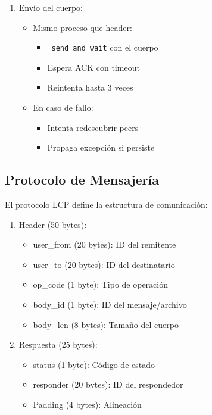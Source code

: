 \documentclass[12pt]{article}
\begin{document}
\begin{enumerate}
    \item Envío del cuerpo:
    \begin{itemize}
        \item Mismo proceso que header:
        \begin{itemize}
            \item \texttt{\_send\_and\_wait} con el cuerpo
            \item Espera ACK con timeout
            \item Reintenta hasta 3 veces
        \end{itemize}
        \item En caso de fallo:
        \begin{itemize}
            \item Intenta redescubrir peers
            \item Propaga excepción si persiste
        \end{itemize}
    \end{itemize}
\end{enumerate}

\subsection{Protocolo de Mensajería}
El protocolo LCP define la estructura de comunicación:

\begin{enumerate}
    \item Header (50 bytes):
    \begin{itemize}
        \item user\_from (20 bytes): ID del remitente
        \item user\_to (20 bytes): ID del destinatario
        \item op\_code (1 byte): Tipo de operación
        \item body\_id (1 byte): ID del mensaje/archivo
        \item body\_len (8 bytes): Tamaño del cuerpo
    \end{itemize}
    \item Respuesta (25 bytes):
    \begin{itemize}
        \item status (1 byte): Código de estado
        \item responder (20 bytes): ID del respondedor
        \item Padding (4 bytes): Alineación
    \end{itemize}
\end{enumerate}
\end{document}
